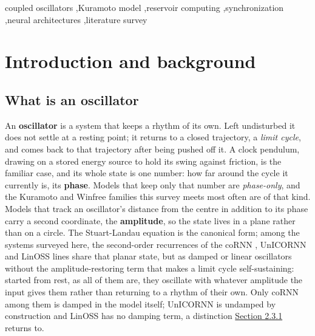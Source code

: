 \documentclass[a4paper,fleqn]{cas-sc}
\begin{document}
\begin{keywords}
coupled oscillators \sep Kuramoto model \sep reservoir
computing \sep synchronization \sep neural architectures \sep literature
survey
\end{keywords}

\maketitle

\section{Introduction and background}\label{sec-1}

\subsection{What is an oscillator}\label{sec-1-1}

An \textbf{oscillator} is a system that keeps a rhythm of its own. Left
undisturbed it does not settle at a resting point; it returns to a
closed trajectory, a \emph{limit cycle}, and comes back to that
trajectory after being pushed off it. A clock pendulum, drawing on a
stored energy source to hold its swing against friction, is the familiar
case, and its whole state is one number: how far around the cycle it
currently is, its \textbf{phase}. Models that keep only that number are
\emph{phase-only}, and the Kuramoto and Winfree families this survey
meets most often are of that kind. Models that track an oscillator's
distance from the centre in addition to its phase carry a second
coordinate, the \textbf{amplitude}, so the state lives in a plane rather
than on a circle. The Stuart-Landau equation is the canonical form;
among the systems surveyed here, the second-order recurrences of the
coRNN \citep{rusch2021}, UnICORNN \citep{unicornn} and LinOSS
\citep{rusch2025} lines share that planar state, but as damped or linear
oscillators without the amplitude-restoring term that makes a limit
cycle self-sustaining: started from rest, as all of them are, they
oscillate with whatever amplitude the input gives them rather than
returning to a rhythm of their own. Only coRNN among them is damped in
the model itself; UnICORNN is undamped by construction and LinOSS has no
damping term, a distinction \hyperref[sec-2-3-1]{Section 2.3.1} returns
to.
\end{document}
